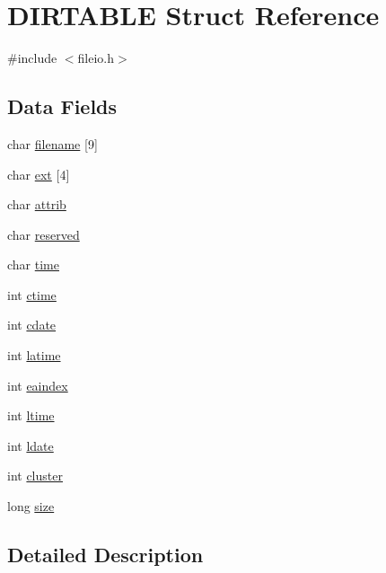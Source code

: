 \hypertarget{struct_d_i_r_t_a_b_l_e}{\section{D\-I\-R\-T\-A\-B\-L\-E Struct Reference}
\label{struct_d_i_r_t_a_b_l_e}
}


{\ttfamily \#include $<$fileio.\-h$>$}

\subsection*{Data Fields}
\begin{DoxyCompactItemize}
\item 
char \hyperlink{struct_d_i_r_t_a_b_l_e_a9c43d1f94c4d6b1f667b553788897f4f}{filename} \mbox{[}9\mbox{]}
\item 
char \hyperlink{struct_d_i_r_t_a_b_l_e_ac5896923235fc86c94be4dd54a255c3d}{ext} \mbox{[}4\mbox{]}
\item 
char \hyperlink{struct_d_i_r_t_a_b_l_e_a0a0fb8303adbd7c1a299c21f7f6413f7}{attrib}
\item 
char \hyperlink{struct_d_i_r_t_a_b_l_e_afbdb0ad610aca15517b193c2c5ec7791}{reserved}
\item 
char \hyperlink{struct_d_i_r_t_a_b_l_e_a969b8147d8235c322110359a8819a603}{time}
\item 
int \hyperlink{struct_d_i_r_t_a_b_l_e_a1adf6ceffc2702e2fe8df332684baafa}{ctime}
\item 
int \hyperlink{struct_d_i_r_t_a_b_l_e_a6f490e2d87432f86a1de3bff5b0b5180}{cdate}
\item 
int \hyperlink{struct_d_i_r_t_a_b_l_e_a874cb2344d259c44d1053590cade58bf}{latime}
\item 
int \hyperlink{struct_d_i_r_t_a_b_l_e_a0029febe28b2e86b5da78334b335830b}{eaindex}
\item 
int \hyperlink{struct_d_i_r_t_a_b_l_e_acdb6339b42a1861122e85f50ffe8f9f8}{ltime}
\item 
int \hyperlink{struct_d_i_r_t_a_b_l_e_a08fb29f289dd4dbf79209f9b9575b62d}{ldate}
\item 
int \hyperlink{struct_d_i_r_t_a_b_l_e_a774dae89cbfb6551d93d30cf922ac733}{cluster}
\item 
long \hyperlink{struct_d_i_r_t_a_b_l_e_a37363161b41c4165b98cba7abc7a9d95}{size}
\end{DoxyCompactItemize}


\subsection{Detailed Description}


